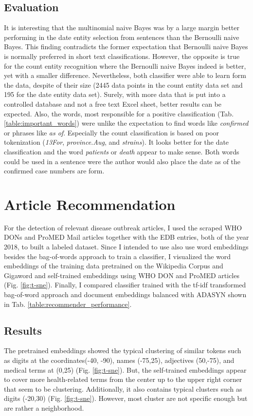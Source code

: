 \subsection{Evaluation}
  It is interesting that the multinomial naive Bayes was by a large margin better performing in the date entity selection from sentences than the Bernoulli naive Bayes. This finding contradicts the former expectation that Bernoulli naive Bayes is normally preferred in short text classifications. However, the opposite is true for the count entity recognition where the Bernoulli naive Bayes indeed is better, yet with a smaller difference. Nevertheless, both classifier were able to learn form the data, despite of their size (2445 data points in the count entity data set and 195 for the date entity data set). Surely, with more data that is put into a controlled database and not a free text Excel sheet, better results can be expected. Also, the words, most responsible for a positive classification (Tab. \ref{table:important_words}) were unlike the expectation to find words like \textit{confirmed} or phrases like \textit{as of}. Especially the count classification is based on poor tokenization (\textit{13For}, \textit{province.Aug}, and \textit{strains}). It looks better for the date classification and the word \textit{patients} or \textit{death} appear to make sense. Both words could be used in a sentence were the author would also place the date as of the confirmed case numbers are form.

\section{Article Recommendation}
  For the detection of relevant disease outbreak articles, I used the scraped WHO DONs and ProMED Mail articles together with the EDB entries, both of the year 2018, to built a labeled dataset. Since I intended to use also use word embeddings besides the bag-of-words approach to train a classifier, I visualized the word embeddings of the training data pretrained on the Wikipedia Corpus and Gigaword and self-trained embeddings using WHO DON and ProMED articles (Fig. \ref{fig:t-sne}). Finally, I compared classifier trained with the tf-idf transformed bag-of-word approach and document embeddings balanced with ADASYN shown in Tab. \ref{table:recommender_performance}.

\subsection{Results}
  The pretrained embeddings showed the typical clustering of similar tokens such as digits at the coordinates(-40, -90), names (-75,25), adjectives (50,-75), and medical terms at (0,25) (Fig. \ref{fig:t-sne}).
  But, the self-trained embeddings appear to cover more health-related terms from the center up to the upper right corner that seem to be clustering. Additionally, it also contains typical clusters such as digits (-20,30) (Fig. \ref{fig:t-sne}). However, most cluster are not specific enough but are rather a neighborhood.


